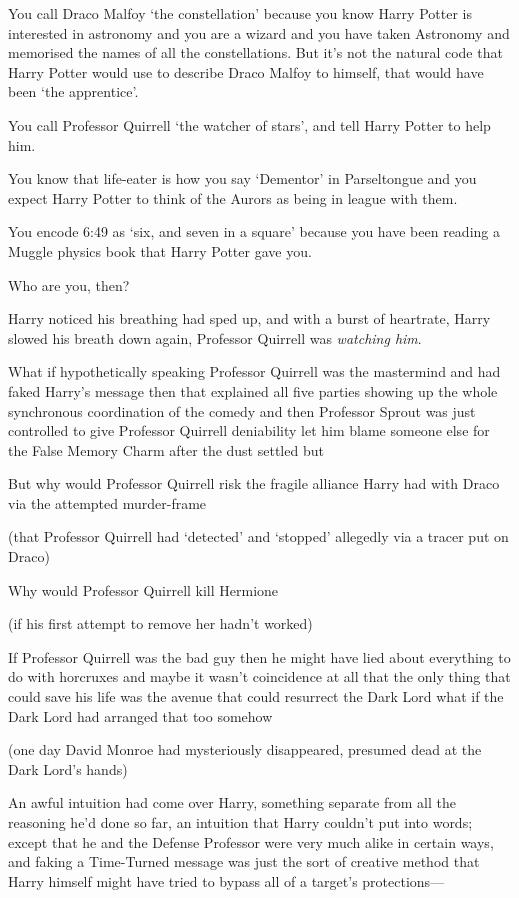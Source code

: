 You call Draco Malfoy `the constellation' because you know Harry Potter is 
interested in astronomy and you are a wizard and you have taken Astronomy and 
memorised the names of all the constellations. But it's not the natural code 
that Harry Potter would use to describe Draco Malfoy to himself, that would 
have been `the apprentice'.

You call Professor Quirrell `the watcher of stars', and tell Harry Potter to 
help him.

You know that life-eater is how you say `Dementor' in Parseltongue and you 
expect Harry Potter to think of the Aurors as being in league with them.

You encode 6:49 as `six, and seven in a square' because you have been reading a 
Muggle physics book that Harry Potter gave you.

Who are you, then?

Harry noticed his breathing had sped up, and with a burst of heartrate, Harry 
slowed his breath down again, Professor Quirrell was \emph{watching him}.

What if hypothetically speaking Professor Quirrell was the mastermind and had 
faked Harry's message then that explained all five parties showing up the whole 
synchronous coordination of the comedy and then Professor Sprout was just 
controlled to give Professor Quirrell deniability let him blame someone else 
for the False Memory Charm after the dust settled but

But why would Professor Quirrell risk the fragile alliance Harry had with Draco 
via the attempted murder-frame

(that Professor Quirrell had `detected' and `stopped' allegedly via a tracer 
put on Draco)

Why would Professor Quirrell kill Hermione

(if his first attempt to remove her hadn't worked)

If Professor Quirrell was the bad guy then he might have lied about everything 
to do with horcruxes and maybe it wasn't coincidence at all that the only thing 
that could save his life was the avenue that could resurrect the Dark Lord what 
if the Dark Lord had arranged that too somehow

(one day David Monroe had mysteriously disappeared, presumed dead at the Dark 
Lord's hands)

An awful intuition had come over Harry, something separate from all the 
reasoning he'd done so far, an intuition that Harry couldn't put into words; 
except that he and the Defense Professor were very much alike in certain ways, 
and faking a Time-Turned message was just the sort of creative method that 
Harry himself might have tried to bypass all of a target's protections---


